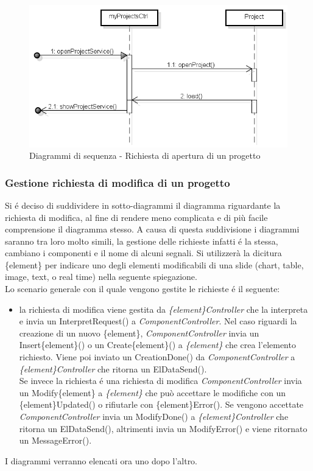 \begin{figure}[h]
	\centering
	\includegraphics[scale=0.5]{img/open.png}
	\caption{Diagrammi di sequenza - Richiesta di apertura di un progetto}
\end{figure}

\newpage

\subsubsection{Gestione richiesta di modifica di un progetto}
Si é deciso di suddividere in sotto-diagrammi il diagramma riguardante la richiesta di modifica, al fine di rendere meno complicata e di più facile comprensione il diagramma stesso. A causa di questa suddivisione i diagrammi saranno tra loro molto simili, la gestione delle richieste infatti é la stessa, cambiano i componenti e il nome di alcuni segnali. Si utilizzerà la dicitura \{element\} per indicare uno degli elementi modificabili di una slide (chart, table, image, text, o real time) nella seguente spiegazione. 
\\Lo scenario generale con il quale vengono gestite le richieste é il seguente:
\begin{itemize}
	\item[]la richiesta di modifica viene gestita da \textit{\{element\}Controller} che la interpreta e invia un InterpretRequest() a \textit{ComponentController}. Nel caso riguardi la creazione di un nuovo \{element\}, \textit{ComponentController} invia un Insert\{element\}() o un Create\{element\}() a \textit{\{element\}} che crea l'elemento richiesto. Viene poi inviato un CreationDone() da \textit{ComponentController} a \textit{\{element\}Controller} che ritorna un ElDataSend().\\
	Se invece la richiesta é una richiesta di modifica \textit{ComponentController} invia un Modify\{element\} a \textit{\{element\}} che può accettare le modifiche con un \{element\}Updated() o rifiutarle con \{element\}Error(). Se vengono accettate \textit{ComponentController} invia un ModifyDone() a \textit{\{element\}Controller} che ritorna un ElDataSend(), altrimenti invia un ModifyError() e viene ritornato un MessageError().
\end{itemize}
I diagrammi verranno elencati ora uno dopo l'altro.
\newpage

